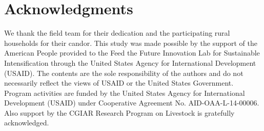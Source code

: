\section{Acknowledgments}

We thank the field team for their dedication and the participating rural households for their candor. This study was made possible by the support of the American People provided to the Feed the Future Innovation Lab for Sustainable Intensification through the United States Agency for International Development (USAID). The contents are the sole responsibility of the authors and do not necessarily reflect the views of USAID or the United States Government. Program activities are funded by the United States Agency for International Development (USAID) under Cooperative Agreement No. AID-OAA-L-14-00006. Also support by the CGIAR Research Program on Livestock is gratefully acknowledged.
